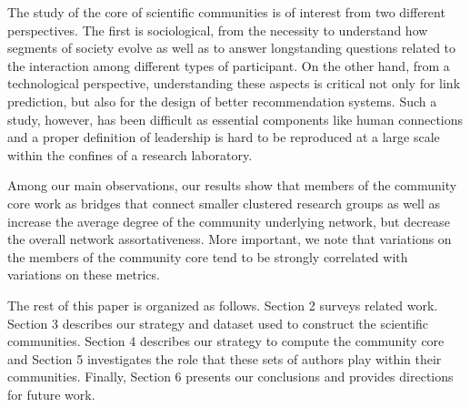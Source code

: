 The study of the core of scientific communities is of interest from two different perspectives.  The first is sociological,  from the necessity to understand how
segments of society evolve as well as to answer longstanding  questions related to the interaction among different types of participant. On the other hand, from a technological perspective,
understanding these aspects is critical not only for link prediction, but also for the design of better recommendation systems. 
Such a study, however, has been difficult as essential components like human connections and a proper definition of leadership is hard to be
reproduced at a large scale within the confines of a research laboratory.

Among our main observations, our results show that members of the community core work as bridges that connect smaller clustered research groups as well as increase the average
degree of the community underlying network, but decrease the overall network assortativeness. More important, we note that variations on the members of the community core tend to be strongly correlated
with variations on these metrics.

The rest of this paper is organized as follows. Section 2 surveys related work. Section 3 describes our strategy and dataset used to construct the 
scientific communities.  Section 4 describes our strategy to compute the community core and Section 5 investigates the
role that these sets of authors play within their communities.  Finally, Section 6 presents our conclusions and provides directions for future work. 





